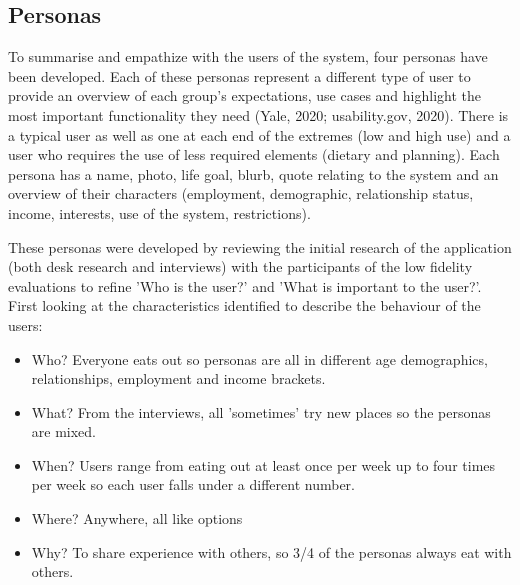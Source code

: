 \documentclass[a4 paper, 12pt]{article}
\begin{document}
    \subsection{Personas}
    To summarise and empathize with the users of the system, four personas have been developed. Each of these personas represent a different type of user to provide an overview of each group's expectations, use cases and highlight the most important functionality they need (Yale, 2020; usability.gov, 2020). There is a typical user as well as one at each end of the extremes (low and high use) and a user who requires the use of less required elements (dietary and planning). Each persona has a name, photo, life goal, blurb, quote relating to the system and an overview of their characters (employment, demographic, relationship status, income, interests, use of the system, restrictions). 
    

    These personas were developed by reviewing the initial research of the application (both desk research and interviews) with the participants of the low fidelity evaluations to refine 'Who is the user?' and 'What is important to the user?'. First looking at the characteristics identified to describe the behaviour of the users:
        \begin{itemize}
            \item Who? Everyone eats out so personas are all in different age demographics, relationships, employment and income brackets.
            \item What? From the interviews, all 'sometimes' try new places so the personas are mixed. 
            \item When? Users range from eating out at least once per week up to four times per week so each user falls under a different number.
            \item Where? Anywhere, all like options
            \item Why? To share experience with others, so 3/4 of the personas always eat with others.
        \end{itemize}
\end{document}
